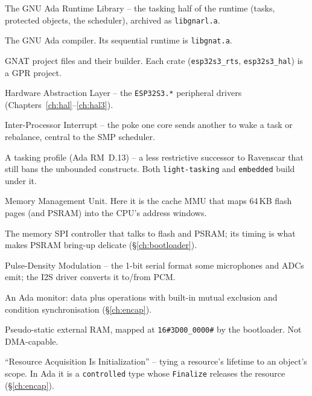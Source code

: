 \begin{description}[style=nextline, leftmargin=0pt]
\item[GNARL] The GNU Ada Runtime Library -- the tasking half of the runtime
  (tasks, protected objects, the scheduler), archived as \texttt{libgnarl.a}.

\item[GNAT] The GNU Ada compiler. Its sequential runtime is \texttt{libgnat.a}.

\item[GPR / \texttt{gprbuild}] GNAT project files and their builder. Each crate
  (\texttt{esp32s3\_rts}, \texttt{esp32s3\_hal}) is a GPR project.

\item[HAL] Hardware Abstraction Layer -- the \texttt{ESP32S3.*} peripheral
  drivers (Chapters~\ref{ch:hal}--\ref{ch:hal3}).

\item[IPI] Inter-Processor Interrupt -- the poke one core sends another to wake a
  task or rebalance, central to the SMP scheduler.

\item[Jorvik] A tasking profile (Ada RM~D.13) -- a less restrictive successor to
  Ravenscar that still bans the unbounded constructs. Both \texttt{light-tasking}
  and \texttt{embedded} build under it.

\item[MMU] Memory Management Unit. Here it is the cache MMU that maps 64\,KB flash
  pages (and PSRAM) into the CPU's address windows.

\item[MSPI] The memory SPI controller that talks to flash and PSRAM; its timing
  is what makes PSRAM bring-up delicate (\S\ref{ch:bootloader}).

\item[PDM] Pulse-Density Modulation -- the 1-bit serial format some microphones
  and ADCs emit; the I2S driver converts it to/from PCM.

\item[protected object] An Ada monitor: data plus operations with built-in mutual
  exclusion and condition synchronisation (\S\ref{ch:encap}).

\item[PSRAM] Pseudo-static external RAM, mapped at \texttt{16\#3D00\_0000\#} by the
  bootloader. Not DMA-capable.

\item[RAII] ``Resource Acquisition Is Initialization'' -- tying a resource's
  lifetime to an object's scope. In Ada it is a \texttt{controlled} type whose
  \texttt{Finalize} releases the resource (\S\ref{ch:encap}).


\end{description}
